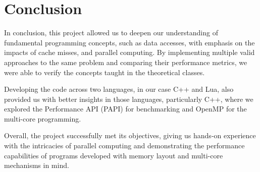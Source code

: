 \section{Conclusion} \label{section:conclusion}

In conclusion, this project allowed us to deepen our understanding of fundamental programming concepts, such as data accesses, with emphasis on the impacts of cache misses, and parallel computing. By implementing multiple valid approaches to the same problem and comparing their performance metrics, we were able to verify the concepts taught in the theoretical classes.

Developing the code across two languages, in our case C++ and Lua, also provided us with better insights in those languages, particularly C++, where we explored the Performance API (PAPI) for benchmarking and OpenMP for the multi-core programming. 

Overall, the project successfully met its objectives, giving us hands-on experience with the intricacies of parallel computing and demonstrating the performance capabilities of programs developed with memory layout and multi-core mechanisms in mind.
